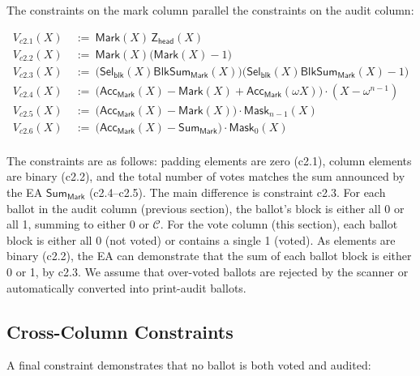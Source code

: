 The constraints on the mark column parallel the constraints on the audit column:

\begin{mdframed}[linewidth=0.6pt,backgroundcolor=verylightpink,innerleftmargin=6pt,innerrightmargin=6pt,innertopmargin=4pt,innerbottommargin=4pt]
\[
\begin{aligned}
V_{c2.1}(X)\ &:=\ \mathsf{Mark}(X)\,\mathsf{Z}_{\mathsf{head}}(X)\\
V_{c2.2}(X)\ &:=\ \mathsf{Mark}(X)\bigl(\mathsf{Mark}(X)-1\bigr)\\
V_{c2.3}(X)\ &:=\ \bigl(\mathsf{Sel}_{\mathsf{blk}}(X)\mathsf{BlkSum}_{\mathsf{Mark}}(X)\bigr)\bigl(\mathsf{Sel}_{\mathsf{blk}}(X)\mathsf{BlkSum}_{\mathsf{Mark}}(X)-1\bigr)\\
V_{c2.4}(X)\ &:=\ \bigl(\mathsf{Acc}_{\mathsf{Mark}}(X)-\mathsf{Mark}(X)+\mathsf{Acc}_{\mathsf{Mark}}(\omega X)\bigr)\cdot(X-\omega^{n-1})\\
V_{c2.5}(X)\ &:=\ \bigl(\mathsf{Acc}_{\mathsf{Mark}}(X)-\mathsf{Mark}(X)\bigr)\cdot \mathsf{Mask}_{n-1}(X)\\
V_{c2.6}(X)\ &:=\ \bigl(\mathsf{Acc}_{\mathsf{Mark}}(X)-\mathsf{Sum}_{\mathsf{Mark}}\bigr)\cdot \mathsf{Mask}_{0}(X)\\
\end{aligned}
\]
\end{mdframed}

 The constraints are as follows: padding elements are zero (c2.1), column elements are binary (c2.2), and the total number of votes matches the sum announced by the EA $\mathsf{Sum}_{\mathsf{Mark}}$ (c2.4--c2.5). The main difference is constraint c2.3. For each ballot in the audit column (previous section), the ballot's block is either all 0 or all 1, summing to either 0 or $\mathcal{C}$. For the vote column (this section), each ballot block is either all 0 (not voted) or contains a single 1 (voted). As elements are binary (c2.2), the EA can demonstrate that the sum of each ballot block is either 0 or 1, by c2.3. We assume that over-voted ballots are rejected by the scanner or automatically converted into print-audit ballots.


\subsection{Cross-Column Constraints}


A final constraint demonstrates that no ballot is both voted and audited:

